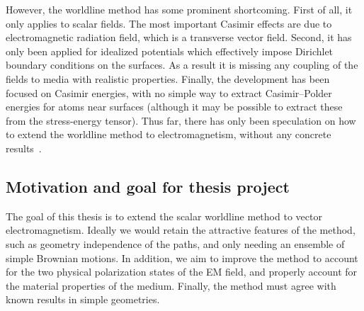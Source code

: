 
However, the worldline method has some prominent shortcoming.  First of all, it only applies 
to scalar fields.
  The most important Casimir effects are due to electromagnetic radiation field, 
which is a transverse vector field.
  Second, it has only been applied for idealized potentials which effectively impose 
Dirichlet boundary conditions on the surfaces.  As a result it is missing any 
coupling of the fields to media with realistic properties.
Finally, the development has been focused on Casimir energies, with no simple way to 
extract Casimir--Polder energies for atoms near surfaces 
(although it may be possible to extract these from the stress-energy tensor). 
Thus far, there has only been speculation on how to extend the worldline method to 
electromagnetism, without any concrete results~\cite{Aehlig2011}.  


\subsection{Motivation and goal for thesis project}

The goal of this thesis is to extend the scalar worldline method to vector electromagnetism.
Ideally we would retain the attractive features of the method, such as geometry independence of the paths,
and only needing an ensemble of simple Brownian motions.
In addition, we aim to improve the method to account for the two physical polarization
states of the EM field, and properly account for the material properties of the medium.  
Finally, the method must agree with known results in simple geometries.  

